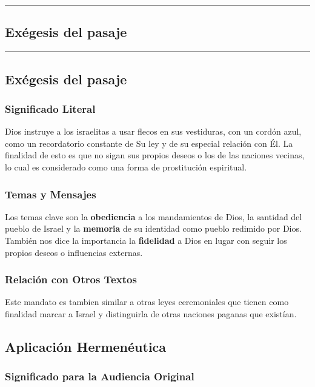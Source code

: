 \newpage
{\color{gray}\hrule}
\begin{center}
\section{Exégesis del pasaje}
\end{center}
{\color{gray}\hrule}

\begin{multicols}{2}

\subsection{Exégesis del pasaje}

\subsubsection{Significado Literal}

Dios instruye a los israelitas a usar flecos en sus vestiduras, con un cordón azul, como un recordatorio constante de Su ley y de su especial relación con Él. La finalidad de esto es que no sigan sus propios deseos o los de las naciones vecinas, lo cual es considerado como una forma de prostitución espiritual.

\subsubsection{Temas y Mensajes}

Los temas clave son la \textbf{obediencia} a los mandamientos de Dios, la santidad del pueblo de Israel y la \textbf{memoria} de su identidad como pueblo redimido por Dios. También nos dice la importancia la \textbf{fidelidad} a Dios en lugar con seguir los propios deseos o influencias externas.

\subsubsection{Relación con Otros Textos}

Este mandato es tambien similar a otras leyes ceremoniales que tienen como finalidad marcar a Israel y distinguirla de otras naciones paganas que existían.

\subsection{Aplicación Hermenéutica}

\subsubsection{Significado para la Audiencia Original}


\end{multicols}

